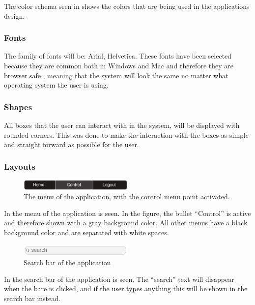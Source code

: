 The color schema seen in  shows the colors that are being used in the applications design. 

\subsubsection{Fonts}
The family of fonts will be: Arial, Helvetica.
These fonts have been selected because they are common both in Windows and Mac and therefore they are browser safe \cite{common_fonts}, meaning that the system will look the same no matter what operating system the user is using.

\subsubsection{Shapes}
All boxes that the user can interact with in the system, will be displayed with rounded corners.
This was done to make the interaction with the boxes as simple and straight forward as possible for the user.

\subsubsection{Layouts}
\begin{figure}[htb]
    \centering
    \includegraphics[width=0.5\textwidth]{gfx/menu.pdf}
    \caption{The menu of the application, with the control menu point activated.}
    \label{fig:menu_design}
\end{figure}

In  the menu of the application is seen.
In the figure, the bullet ``Control'' is active and therefore shown with a gray background color.
All other menus have a black background color and are separated with white spaces.

\begin{figure}[htb]
    \centering
    \includegraphics[width=0.5\textwidth]{gfx/search.pdf}
    \caption{Search bar of the application}
    \label{fig:search_bar_design}
\end{figure}

In  the search bar of the application is seen.
The ``search'' text will disappear when the bare is clicked, and if the user types anything this will be shown in the search bar instead.


